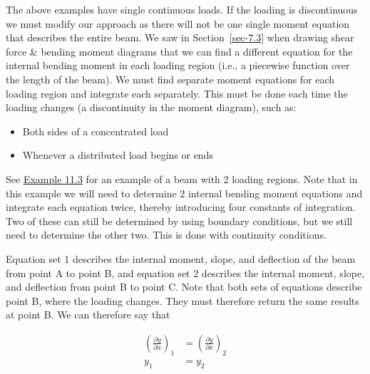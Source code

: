 \documentclass[
  letterpaper,
  DIV=11,
  numbers=noendperiod]{scrreprt}
\theoremstyle{definition}
\theoremstyle{remark}
\begin{document}
The above examples have single continuous loads. If the loading is
discontinuous we must modify our approach as there will not be one
single moment equation that describes the entire beam. We saw in
Section~\ref{sec-7.3} when drawing shear force \& bending moment
diagrams that we can find a different equation for the internal bending
moment in each loading region (i.e., a piecewise function over the
length of the beam). We must find separate moment equations for each
loading region and integrate each separately. This must be done each
time the loading changes (a discontinuity in the moment diagram), such
as:

\begin{itemize}
\item
  Both sides of a concentrated load
\item
  Whenever a distributed load begins or ends
\end{itemize}

See \hyperref[example-11.3]{Example 11.3} for an example of a beam with
2 loading regions. Note that in this example we will need to determine 2
internal bending moment equations and integrate each equation twice,
thereby introducing four constants of integration. Two of these can
still be determined by using boundary conditions, but we still need to
determine the other two. This is done with continuity conditions.

Equation set 1 describes the internal moment, slope, and deflection of
the beam from point A to point B, and equation set 2 describes the
internal moment, slope, and deflection from point B to point C. Note
that both sets of equations describe point B, where the loading changes.
They must therefore return the same results at point B. We can therefore
say that

\[
\begin{aligned}
\left(\frac{\partial y}{\partial x}\right)_{1} & =\left(\frac{\partial y}{\partial x}\right)_{2} \\
y_{1} & =y_{2}
\end{aligned}
\]
\end{document}

